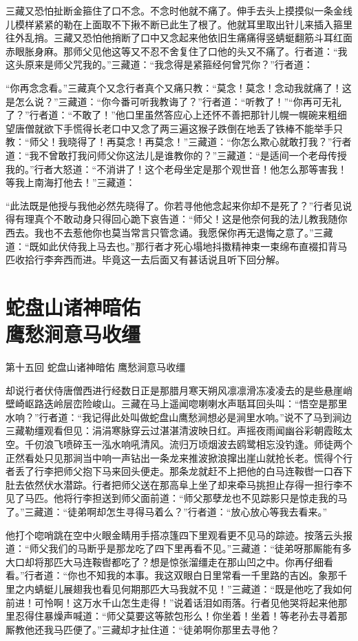\documentclass[12pt,UTF8]{ctexbook}
\begin{document}
{三藏又恐怕扯断金箍住了口不念。不念时他就不痛了。伸手去头上摸摸似一条金线儿模样紧紧的勒在上面取不下揪不断已此生了根了。他就耳里取出针儿来插入箍里往外乱捎。三藏又恐怕他捎断了口中又念起来他依旧生痛痛得竖蜻蜓翻筋斗耳红面赤眼胀身麻。那师父见他这等又不忍不舍复住了口他的头又不痛了。行者道：“我这头原来是师父咒我的。”三藏道：“我念得是紧箍经何曾咒你？”行者道：

“你再念念看。”三藏真个又念行者真个又痛只教：“莫念！莫念！念动我就痛了！这是怎么说？”三藏道：“你今番可听我教诲了？”行者道：“听教了！”“你再可无礼了？”行者道：“不敢了！”他口里虽然答应心上还怀不善把那针儿幌一幌碗来粗细望唐僧就欲下手慌得长老口中又念了两三遍这猴子跌倒在地丢了铁棒不能举手只教：“师父！我晓得了！再莫念！再莫念！”三藏道：“你怎么欺心就敢打我？”行者道：“我不曾敢打我问师父你这法儿是谁教你的？”三藏道：“是适间一个老母传授我的。”行者大怒道：“不消讲了！这个老母坐定是那个观世音！他怎么那等害我！等我上南海打他去！”三藏道：

“此法既是他授与我他必然先晓得了。你若寻他他念起来你却不是死了？”行者见说得有理真个不敢动身只得回心跪下哀告道：“师父！这是他奈何我的法儿教我随你西去。我也不去惹他你也莫当常言只管念诵。我愿保你再无退悔之意了。”三藏道：“既如此伏侍我上马去也。”那行者才死心塌地抖擞精神束一束绵布直裰扣背马匹收拾行李奔西而进。毕竟这一去后面又有甚话说且听下回分解。

\chapter[蛇盘山诸神暗佑\ 鹰愁涧意马收缰]{蛇盘山诸神暗佑\\鹰愁涧意马收缰}

第十五回 蛇盘山诸神暗佑 鹰愁涧意马收缰

却说行者伏侍唐僧西进行经数日正是那腊月寒天朔风凛凛滑冻凌凌去的是些悬崖峭壁崎岖路迭岭层峦险峻山。三藏在马上遥闻唿喇喇水声聒耳回头叫：“悟空是那里水响？”行者道：“我记得此处叫做蛇盘山鹰愁涧想必是涧里水响。”说不了马到涧边三藏勒缰观看但见：涓涓寒脉穿云过湛湛清波映日红。声摇夜雨闻幽谷彩朝霞眩太空。千仞浪飞喷碎玉一泓水响吼清风。流归万顷烟波去鸥鹭相忘没钓逢。师徒两个正然看处只见那涧当中响一声钻出一条龙来推波掀浪撺出崖山就抢长老。慌得个行者丢了行李把师父抱下马来回头便走。那条龙就赶不上把他的白马连鞍辔一口吞下肚去依然伏水潜踪。行者把师父送在那高阜上坐了却来牵马挑担止存得一担行李不见了马匹。他将行李担送到师父面前道：“师父那孽龙也不见踪影只是惊走我的马了。”三藏道：“徒弟啊却怎生寻得马着么？”行者道：“放心放心等我去看来。”

他打个唿哨跳在空中火眼金睛用手搭凉篷四下里观看更不见马的踪迹。按落云头报道：“师父我们的马断乎是那龙吃了四下里再看不见。”三藏道：“徒弟呀那厮能有多大口却将那匹大马连鞍辔都吃了？想是惊张溜缰走在那山凹之中。你再仔细看看。”行者道：“你也不知我的本事。我这双眼白日里常看一千里路的吉凶。象那千里之内蜻蜓儿展翅我也看见何期那匹大马我就不见！”三藏道：“既是他吃了我如何前进！可怜啊！这万水千山怎生走得！”说着话泪如雨落。行者见他哭将起来他那里忍得住暴燥声喊道：“师父莫要这等脓包形么！你坐着！坐着！等老孙去寻着那厮教他还我马匹便了。”三藏却才扯住道：“徒弟啊你那里去寻他？

}
\end{document}
